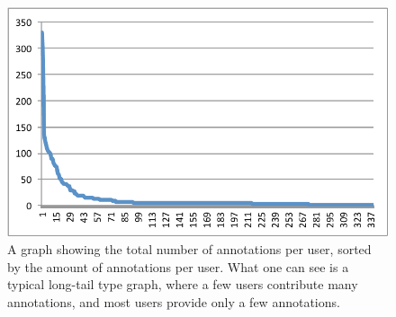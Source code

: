 \begin{figure}[h]
\centering
\includegraphics[width=\columnwidth]{figures/orcagameClassificationsPerUser}
\caption{A graph showing the total number of annotations per user,
  sorted by the amount of annotations per user.  What one can see is
  a typical long-tail type graph, where a few users contribute many
  annotations, and most users provide only a few annotations.}
\label{fig:OrcaGameClassificationsPerUser}
\end{figure}

